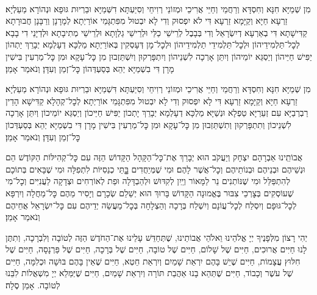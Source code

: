 \documentclass[twoside, openany, parskip=half, 11pt]{book}
\begin{document}

\shabbos\\
מִן שְׁמַיָּא חִנָּא וְחִסְדָּא וְרַחֲמֵי וְחַיֵּי אֲרִיכֵי וּמְזוֹנֵי רְוִיחֵי וְסִיַּעְתָּא דִשְּׁמַיָּא וּבַרְיוּת גּוּפָא וּנְהוֹרָא מַעַלְיָא׃ זַרְעָא חַיָּא וְקַיָּמָא זַרְעָא דִּי לֹא יִפְסוּק וְדִי לָא יִבְטוּל מִפִּתְגָּמֵי אוֹרַיְתָא׃ לְמָרָנָן וְרַבָּנָן חֲבוּרָתָא קַדִּישָׁתָא דִּי בְאַרְעָא דְיִשְׂרָאֵל וְדִי בְּבָבֶל לְרֵישֵׁי כַלֵּי וּלְרֵישֵׁי גַלְוָתָא וּלְרֵישֵׁי מְתִיבָתָא וּלְדַיָּנֵי דִי בָבָא׃ לְכׇל־תַּלְמִידֵיהוֹן וּלְכׇל־תַּלְמִידֵי תַלְמִידֵיהוֹן וּלְכׇל־מָן דְּעָסְקִין בְּאוֹרַיְתָא׃ מַלְכָּא דְעָלְמָא יְבָרֵךְ יַתְהוֹן יַפִּישׁ חַיֵּיהוֹן וְיַסְגֵּא יוֹמֵיהוֹן וְיִתֵּן אָרְכָה לִשְׁנֵיהוֹן וְיִתְפָּרְקוּן וְיִשְׁתֵּזְבוּן מִן כׇּל־עָקָא וּמִן כׇּל־מַרְעִין בִּישִׁין מָרָן דִּי בִשְׁמַיָּא יְהֵא בְּסַעְדְּהוֹן כׇּל־זְמַן וְעִדָּן׃ וְנֹאמַר אָמֵן׃



מִן שְׁמַיָּא חִנָּא וְחִסְדָּא וְרַחֲמֵי וְחַיֵּי אֲרִיכֵי וּמְזוֹנֵי רְוִיחֵי וְסִיַּעְתָּא דִּשְׁמַיָּא וּבַרְיוּת גּוּפָא וּנְהוֹרָא מַעַלְיָא׃ זַרְעָא חַיָּא וְקַיָּמָא זַרְעָא דִּי לָא יִפְסוּק וְדִי לָא יִבְטוּל מִפִּתְגָּמֵי אוֹרַיְתָא׃ לְכׇל־קְהָלָא קַדִּישָׁא הָדֵין רַבְרְבַיָּא עִם זְעֵרַיָּא טַפְלָא וּנְשַׁיָּא׃ מַלְכָּא דְעָלְמָא יְבָרֵךְ יָתְכוֹן יַפִּישׁ חַיֵּיכוֹן וְיַסְגֵּא יוֹמֵיכוֹן וְיִתֵּן אָרְכָה לִשְׁנֵיכוֹן וְתִתְפָּרְקוּן וְתִשְׁתֵּזְבוּן מִן כׇּל־עָקָא וּמִן כׇּל־מַרְעִין בִּישִׁין מָרָן דִּי בִשְׁמַיָּא יְהֵא בְּסַעְדְּכוֹן כׇּל־זְמַן וְעִדָּן׃ וְנֹאמַר אָמֵן׃

אֲבוֹתֵֽינוּ אַבְרָהָם יִצְחָק וְיַעֲקֹב הוּא יְבָרֵךְ אֶת־כׇּל־הַקָּהָל הַקָּדוֹשׁ הַזֶּה עִם כׇּל־קְהִילּוֹת הַקּוֹדֶשׁ הֵם וּנְשֵׁיהֶם וּבְנֵיהֶם וּבְנוֹתֵיהֶם וְכׇל־אֲשֶׁר לָהֶם׃ וּמִי שֶׁמְּיַחֲדִים בׇׇׇּתֵּי כְנֵסִיּוֹת לִתְפִלָּה וּמִי שֶׁבָּאִים בְּתוֹכָם לְהִתְפַּלֵּל וּמִי שֶׁנּוֹתְנִים נֵר לַמָּאוֹר וְיַֽיִן לְקִדּוּשׁ וּלְהַבְדָּלָה וּפַת לְאוֹרְחִים וּצְדָקָה לַעֲנִיִּים וְכׇל־מִי שֶׁעוֹסְקִים בְּצׇרְכֵי צִבּוּר בֶּאֱמוּנָה הַקָּדוֹשׁ בָּרוּךְ הוּא יְשַׁלֵם שְׂכָרָם וְיָסִיר מֵהֶם כׇּל־מַחֲלָה וְיִרְפָּא לְכׇל־גּוּפָם וְיִסְלַח לְכׇל־עֲוֹנָם וְיִשְׁלַח בְּרָכָה וְהַצְלָחָה בְּכׇל־מַעֲשֵׂה יְדֵיהֶם עִם כׇּל־יִשְׂרָאֵל אֲחֵיהֶם וְנֹאמַר אָמֵן׃


יְהִי רָצוֹן מִלְּפָנֶיךָ יְיָ אֱלֹהֵינוּ וֵאלֹהֵי אֲבוֹתֵינוּ,
שֶׁתְּחַדֵּשׁ עָלֵינוּ אֶת־הַחֹדֶשׁ הַזֶּה לְטוֹבָה וְלִבְרָכָה,
וְתִתֶּן לָנוּ חַיִּים אֲרוּכִים,
חַיִּים שֶׁל שָׁלוֹם,
חַיִּים שֶׁל טוֹבָה,
חַיִּים שֶׁל בְּרָכָה,
חַיִּים שֶׁל פַּרְנָסָה,
חַיִּים שֶׁל חִלּוּץ עֲצָמוֹת,
חַיִּים שֶׁיֵשׁ בָּהֶם יִרְאַת שָׁמַיִם וְיִרְאַת חֵטְא,
חַיִּים שֶׁאֵין בָּהֶם בּוּשָׁה וּכְלִמָּה,
חַיִּים שֶׁל עשֶׁר וְכָבוֹד,
חַיִּים שֶׁתְּהֵא בָנוּ אַהֲבַת תּוֹרָה וְיִרְאַת שָׁמַיִם,
חַיִּים שֶׁיְּמַּלֵא יְיָ מִשְׁאֲלוֹת לִבֵּנוּ לְטוֹבָה. אָמֵן סֶלָה׃
\end{document}
